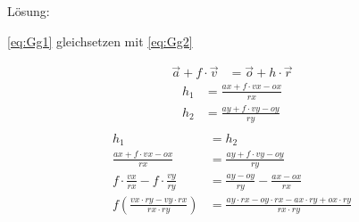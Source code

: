 \documentclass[reducespace,stylepage,semiarbeit]{spezidoc}
\begin{document}
\newpage
Lösung:
\begin{center}
\ref{eq:Gg1} gleichsetzen mit \ref{eq:Gg2}
\end{center}
\begin{equation*}
\begin{split} 
\vec{a} + f \cdot \vec{v} &= \vec{o} + h \cdot \vec{r}
\end{split}
\end{equation*}
\begin{equation*}
\begin{split}
h_1 &= \frac{ax + f \cdot vx - ox}{rx} \\
h_2 &= \frac{ay + f \cdot vy - oy}{ry} \\
\end{split}
\end{equation*}
\begin{equation*}
\begin{split}
h_1 &= h_2 \\
\frac{ax + f \cdot vx - ox}{rx} &= \frac{ay + f \cdot vy - oy}{ry} \\
f \cdot \frac{vx}{rx} - f \cdot \frac{vy}{ry} &= \frac{ay - oy}{ry} - \frac{ax - ox}{rx} \\
f(\frac{vx \cdot ry - vy \cdot rx}{rx \cdot ry}) &= \frac{ay \cdot rx - oy \cdot rx - ax \cdot ry + ox \cdot ry}{rx \cdot ry} 
\end{split}
\end{equation*}
\end{document}
